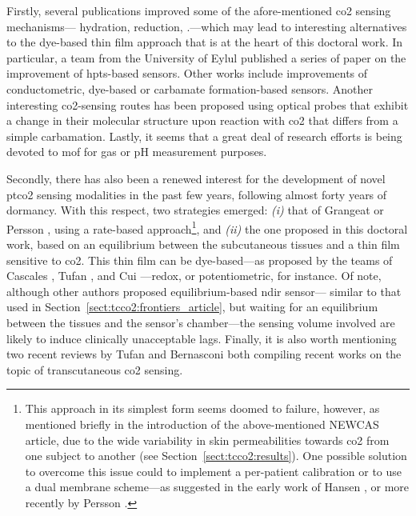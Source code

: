 Firstly, several publications improved some of the afore-mentioned \gls{co2} sensing mechanisms---\ie{} hydration, reduction, \etc.---which may lead to interesting alternatives to the dye-based thin film approach that is at the heart of this doctoral work. In particular, a team from the University of Eylul published a series of paper on the improvement of \gls{hpts}-based sensors\cite{ongun2021, ongun2023a, oguzlar2023b, yilmaz2024}. Other works include improvements of conductometric\cite{kotbi2022, rath2024}, dye-based\cite{shahid2022, zhang2023atu} or carbamate formation-based\cite{lee2022tur, choi2024} sensors. Another interesting \gls{co2}-sensing routes has been proposed using optical probes that exhibit a change in their molecular structure upon reaction with \gls{co2} that differs from a simple carbamation\cite{green2022, zhu2024}. Lastly, it seems that a great deal of research efforts is being devoted to \gls{mof} for gas or pH measurement purposes\cite{zhang2023lum, mohammedameen2024}.

Secondly, there has also been a renewed interest for the development of novel \gls{ptco2} sensing modalities in the past few years, following almost forty years of dormancy. With this respect, two strategies emerged: \textit{(i)} that of Grangeat \etal{}\cite{grangeat2023} or Persson \etal{}\cite{persson2023}, using a rate-based approach\footnote{This approach in its simplest form seems doomed to failure, however, as mentioned briefly in the introduction of the above-mentioned NEWCAS article\cite{dervieux2024newcas}, due to the wide variability in skin permeabilities towards \gls{co2} from one subject to another (see Section~\ref{sect:tcco2:results}). One possible solution to overcome this issue could to implement a per-patient calibration or to use a dual membrane scheme---as suggested in the early work of Hansen \etal{}\cite{hansen1980}, or more recently by Persson \etal{}\cite{persson2023}.}, and \textit{(ii)} the one proposed in this doctoral work, based on an equilibrium between the subcutaneous tissues and a thin film sensitive to \gls{co2}. This thin film can be dye-based---as proposed by the teams of Cascales \etal{}\cite{cascales2022, cascales2023}, Tufan \etal{}\cite{tufan2022, tufan2023a, tufan2023c}, and Cui \etal{}\cite{cui2024}---redox\cite{ahuja2023}, or potentiometric\cite{jia2024}, for instance. Of note, although other authors proposed equilibrium-based \gls{ndir} sensor---\ie{} similar to that used in Section~\ref{sect:tcco2:frontiers_article}, but waiting for an equilibrium between the tissues and the sensor's chamber---the sensing volume involved are likely to induce clinically unacceptable lags\cite{li2023non, angelucci2024, elsafoury2024}. Finally, it is also worth mentioning two recent reviews by Tufan \etal{}\cite{tufan2023b} and Bernasconi \etal{}\cite{bernasconi2024} both compiling recent works on the topic of transcutaneous \gls{co2} sensing.

